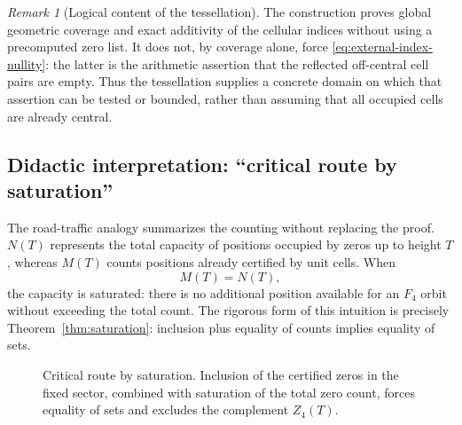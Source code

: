 \documentclass[11pt]{amsart}
\theoremstyle{definition}
\theoremstyle{remark}
\newtheorem{remark}[theorem]{Remark}
\begin{document}
\begin{remark}[Logical content of the tessellation]
The construction proves global geometric coverage and exact additivity of the
cellular indices without using a precomputed zero list.  It does not, by
coverage alone, force \eqref{eq:external-index-nullity}: the latter is the
arithmetic assertion that the reflected off-central cell pairs are empty.
Thus the tessellation supplies a concrete domain on which that assertion can
be tested or bounded, rather than assuming that all occupied cells are already
central.
\end{remark}

\subsection{Didactic interpretation: ``critical route by saturation''}
The road-traffic analogy summarizes the counting without replacing the proof. $N(T)$ represents the total capacity of positions occupied by zeros up to height $T$, whereas $M(T)$ counts positions already certified by unit cells. When
\[
 M(T)=N(T),
\]
the capacity is saturated: there is no additional position available for an $F_4$ orbit without exceeding the total count. The rigorous form of this intuition is precisely Theorem~\ref{thm:saturation}: inclusion plus equality of counts implies equality of sets.

\begin{figure}[t]
\centering
{}
\caption{Critical route by saturation. Inclusion of the certified zeros in the fixed sector, combined with saturation of the total zero count, forces equality of sets and excludes the complement $Z_4(T)$.}
\label{fig:saturation-route}
\end{figure}
\end{document}
